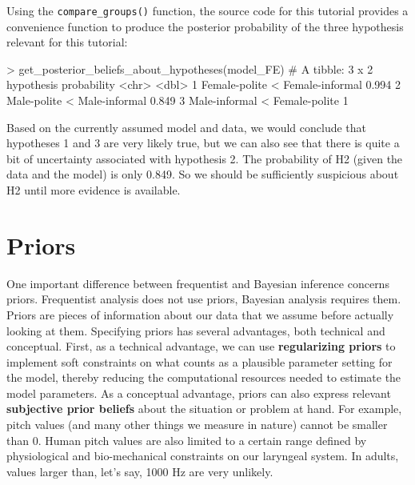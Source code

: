 \documentclass[nobib]{tufte-handout}
\begin{document}
Using the \texttt{compare\_groups()} function, the source code for this tutorial provides a
convenience function to produce the posterior probability of the three hypothesis relevant for
this tutorial: 

\medskip

\begin{minipage}[]{\textwidth}
\begin{rc}
> get_posterior_beliefs_about_hypotheses(model_FE)
# A tibble: 3 x 2
  hypothesis                      probability
  <chr>                                 <dbl>
1 Female-polite < Female-informal       0.994
2 Male-polite < Male-informal           0.849
3 Male-informal < Female-polite         1
\end{rc}
\end{minipage}

Based on the currently assumed model and data, we would conclude that hypotheses 1 and 3 are very likely true, but we can also see that there is quite a bit of uncertainty associated with hypothesis 2. The probability of H2 (given the data and the model) is only 0.849. So we should be sufficiently suspicious about H2 until more evidence is available.

%

\section{Priors}

One important difference between frequentist and Bayesian inference concerns priors. Frequentist analysis does not use priors, Bayesian analysis requires them. Priors are pieces of information about our data that we assume before actually looking at them. Specifying priors has several advantages, both technical and conceptual. First, as a technical advantage, we can use \textbf{regularizing priors} to implement soft constraints on what counts as a plausible parameter setting for the model, thereby reducing the computational resources needed to estimate the model parameters.
%
%
As a conceptual advantage, priors can also express relevant \textbf{subjective prior beliefs} about the situation or problem at hand. For example, pitch values (and many other things we measure in nature) cannot be smaller than 0. Human pitch values are also limited to a certain range defined by physiological and bio-mechanical constraints on our laryngeal system. In adults, values larger than, let's say, 1000 Hz are very unlikely. 
 
\end{document}
